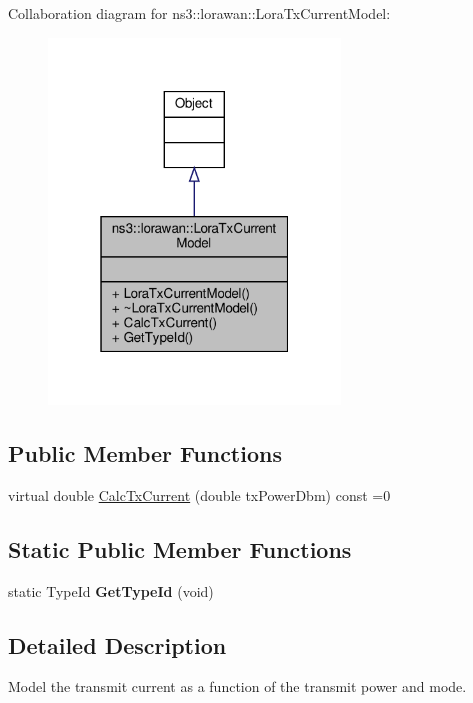 Collaboration diagram for ns3\+:\+:lorawan\+:\+:Lora\+Tx\+Current\+Model\+:
\nopagebreak
\begin{figure}[H]
\begin{center}
\leavevmode
\includegraphics[width=220pt]{classns3_1_1lorawan_1_1LoraTxCurrentModel__coll__graph}
\end{center}
\end{figure}
\subsection*{Public Member Functions}
\begin{DoxyCompactItemize}
\item 
virtual double \hyperlink{classns3_1_1lorawan_1_1LoraTxCurrentModel_ad4143a40cb10d4cbd4bf838e006780c7}{Calc\+Tx\+Current} (double tx\+Power\+Dbm) const =0
\end{DoxyCompactItemize}
\subsection*{Static Public Member Functions}
\begin{DoxyCompactItemize}
\item 
\mbox{\label{classns3_1_1lorawan_1_1LoraTxCurrentModel_a3f01639f27e81d82c57c41ded59a5c87}} 
static Type\+Id {\bfseries Get\+Type\+Id} (void)
\end{DoxyCompactItemize}


\subsection{Detailed Description}
Model the transmit current as a function of the transmit power and mode. 

